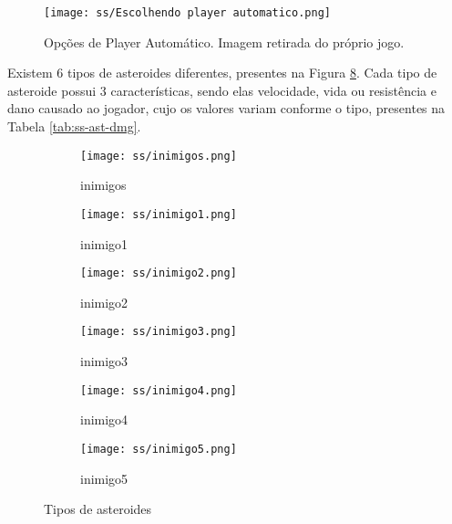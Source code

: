 \begin{figure}
  \centering
  \texttt{[image: ss/Escolhendo player automatico.png]}
  \caption{Opções de Player Automático. Imagem retirada do próprio jogo.\label{fig:ss-player-ai}}
\end{figure}


Existem 6 tipos de asteroides diferentes, presentes na Figura \ref{fig:ss-tipo-ast}. Cada tipo de asteroide possui 3 características, sendo elas velocidade, vida ou resistência e dano causado ao jogador, cujo os valores variam conforme o tipo, presentes na Tabela \ref{tab:ss-ast-dmg}. 

\begin{figure}
     \centering
     \begin{subfigure}[b]{0.15\textwidth}
         \centering
         \texttt{[image: ss/inimigos.png]}
         \caption{inimigos}
         \label{fig:ss-inimigos}
     \end{subfigure}
     \hfill
     \begin{subfigure}[b]{0.15\textwidth}
         \centering
         \texttt{[image: ss/inimigo1.png]}
         \caption{inimigo1}
         \label{fig:ss-inimigo1}
     \end{subfigure}
     \hfill
     \begin{subfigure}[b]{0.15\textwidth}
         \centering
         \texttt{[image: ss/inimigo2.png]}
         \caption{inimigo2}
         \label{fig:ss-inimigo2}
     \end{subfigure}

     \begin{subfigure}[b]{0.15\textwidth}
         \centering
         \texttt{[image: ss/inimigo3.png]}
         \caption{inimigo3}
         \label{fig:ss-inimigo3}
     \end{subfigure}
     \hfill
     \begin{subfigure}[b]{0.15\textwidth}
         \centering
         \texttt{[image: ss/inimigo4.png]}
         \caption{inimigo4}
         \label{fig:ss-inimigo4}
     \end{subfigure}
     \hfill
     \begin{subfigure}[b]{0.15\textwidth}
         \centering
         \texttt{[image: ss/inimigo5.png]}
         \caption{inimigo5}
         \label{fig:figure-inimigos}
     \end{subfigure}     
     \caption{Tipos de asteroides}
     \label{fig:ss-tipo-ast}
\end{figure}

